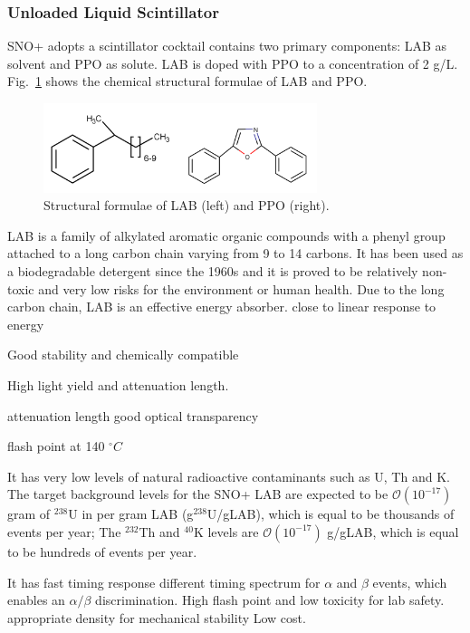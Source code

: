\subsubsection{Unloaded Liquid Scintillator}\label{sect:LS_SNO+}
SNO+ adopts a scintillator cocktail contains two primary components: LAB as solvent and PPO as solute. LAB is doped with PPO to a concentration of 2 g/L. Fig.~\ref{labppo-molecule} shows the chemical structural formulae of LAB and PPO\cite{collaboration2020development}.
\begin{figure}[!htb]
	\centering
	\includegraphics[width=8cm]{lab-ppo-molecule.png}
	\caption[Structural formulae of LAB and PPO.]{Structural formulae of LAB (left) and PPO (right).}
	\label{labppo-molecule}
\end{figure}

LAB is a family of alkylated aromatic organic compounds with a phenyl group attached to a long carbon chain varying from 9 to 14 carbons\cite{wiki_LAB, collaboration2020development}. It has been used as a biodegradable detergent since the 1960s and it is proved to be relatively non-toxic and very low risks for the environment or human health\cite{wiki_LAB}. Due to the long carbon chain, LAB is an effective energy absorber.
close to linear response to energy


Good stability and chemically compatible

High light yield and attenuation length.

attenuation length
good optical transparency 

 flash point at 140 $^\circ C$

 It has very low levels of natural radioactive contaminants such as U, Th and K.
The target background levels for the SNO+ LAB are expected to be $\mathcal O(10^{-17})$ gram of $^{238}$U in per gram LAB (g$^{238}$U/gLAB), which is equal to be thousands of events per year;
The $^{232}$Th and $^{40}$K levels are $\mathcal O(10^{-17})$ g/gLAB, which is equal to be hundreds of events per year\cite{markchen_bkg}.


It has fast timing response different timing spectrum for $\alpha$ and $\beta$ events, which enables an $\alpha/\beta$ discrimination. 
High flash point and low toxicity for lab safety.
 appropriate density for mechanical stability
 Low cost.


